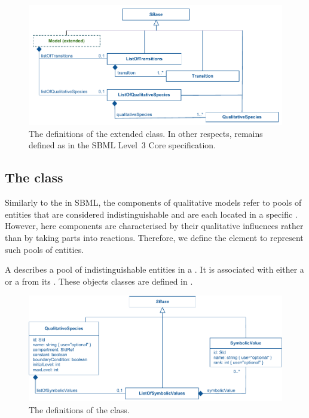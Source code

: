 \begin{figure}
  \includegraphics{figs/qual-extended-model-uml.pdf}
  \caption{The definitions of the extended \Model class. In other respects, \Model remains defined as
    in the SBML Level~3 Core specification.}
  \label{qual-extended-model-uml}
\end{figure}


\subsection{The  class}
\label{qualSpecies-class}
Similarly to the  in SBML, the components of qualitative models refer to pools of entities that are considered indistinguishable and are each located in a specific . However, here components are characterised by their qualitative influences rather than by taking parts into reactions. Therefore, we define the \QualitativeSpecies element to represent such pools of entities.

A \QualitativeSpecies describes a pool of indistinguishable entities in a . It is associated with either a  or a  from its \ListOfSymbolicValues. These objects classes are defined in .

\begin{figure}
  \includegraphics{figs/qual-qualitative-species-uml.pdf}
  \caption{The definitions of the \QualitativeSpecies class. }
  \label{qual-qualitative-species-uml}
\end{figure}

